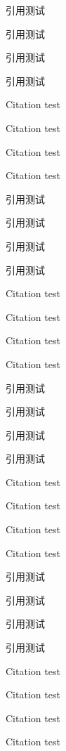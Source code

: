 \documentclass{article}
\begin{document}
\begin{multicols}{2}
引用\citet{foo}测试\par
引用\citet[42]{foo}测试\par
引用\citet[见][]{foo}测试\par
引用\citet[见][42]{foo}测试\par

Citation \citet{foo} test\par
Citation \citet[42]{foo} test\par
Citation \citet[see][]{foo} test\par
Citation \citet[see][42]{foo} test\par


引用\citep{foo}测试\par
引用\citep[42]{foo}测试\par
引用\citep[见][]{foo}测试\par
引用\citep[见][42]{foo}测试\par

Citation \citep{foo} test\par
Citation \citep[42]{foo} test\par
Citation \citep[see][]{foo} test\par
Citation \citep[see][42]{foo} test\par


引用测试\par
引用测试\par
引用测试\par
引用测试\par

Citation  test\par
Citation  test\par
Citation  test\par
Citation  test\par

引用测试\par
引用测试\par
引用测试\par
引用测试\par

Citation  test\par
Citation  test\par
Citation  test\par
Citation  test\par


\end{multicols}
\end{document}
